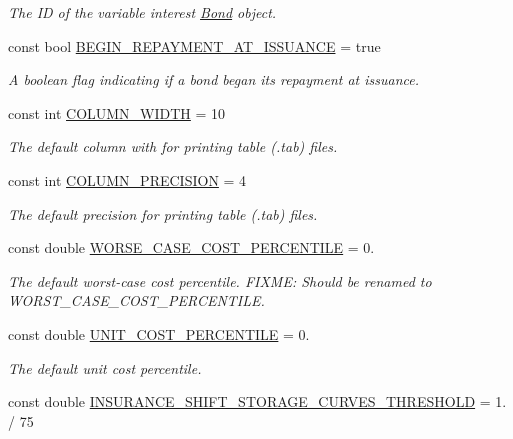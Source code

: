 \begin{DoxyCompactItemize}
\begin{DoxyCompactList}\small\item\em The ID of the variable interest \mbox{\hyperlink{classBond}{Bond}} object. \end{DoxyCompactList}\item 
const bool \mbox{\hyperlink{classConstants_a603925d07357a01d9531549e46b2936c}{B\+E\+G\+I\+N\+\_\+\+R\+E\+P\+A\+Y\+M\+E\+N\+T\+\_\+\+A\+T\+\_\+\+I\+S\+S\+U\+A\+N\+CE}} = true
\begin{DoxyCompactList}\small\item\em A boolean flag indicating if a bond began its repayment at issuance. \end{DoxyCompactList}\item 
const int \mbox{\hyperlink{classConstants_ab7a5abf9228bcce4babf9a84cd66deb1}{C\+O\+L\+U\+M\+N\+\_\+\+W\+I\+D\+TH}} = 10
\begin{DoxyCompactList}\small\item\em The default column with for printing table ({\ttfamily .tab}) files. \end{DoxyCompactList}\item 
const int \mbox{\hyperlink{classConstants_a52f7a9d94123775aa42a979c4c97dc71}{C\+O\+L\+U\+M\+N\+\_\+\+P\+R\+E\+C\+I\+S\+I\+ON}} = 4
\begin{DoxyCompactList}\small\item\em The default precision for printing table ({\ttfamily .tab}) files. \end{DoxyCompactList}\item 
const double \mbox{\hyperlink{classConstants_af0f5a11d2e7941b6c85ea1b8034d3996}{W\+O\+R\+S\+E\+\_\+\+C\+A\+S\+E\+\_\+\+C\+O\+S\+T\+\_\+\+P\+E\+R\+C\+E\+N\+T\+I\+LE}} = 0.
\begin{DoxyCompactList}\small\item\em The default worst-\/case cost percentile. F\+I\+X\+ME\+: Should be renamed to {\ttfamily W\+O\+R\+S\+T\+\_\+\+C\+A\+S\+E\+\_\+\+C\+O\+S\+T\+\_\+\+P\+E\+R\+C\+E\+N\+T\+I\+LE}. \end{DoxyCompactList}\item 
const double \mbox{\hyperlink{classConstants_a5d8074ae29c79331d667f61728233a5b}{U\+N\+I\+T\+\_\+\+C\+O\+S\+T\+\_\+\+P\+E\+R\+C\+E\+N\+T\+I\+LE}} = 0.
\begin{DoxyCompactList}\small\item\em The default unit cost percentile. \end{DoxyCompactList}\item 
const double \mbox{\hyperlink{classConstants_a40ab8dd088d886af9b5795c6b9db22ca}{I\+N\+S\+U\+R\+A\+N\+C\+E\+\_\+\+S\+H\+I\+F\+T\+\_\+\+S\+T\+O\+R\+A\+G\+E\+\_\+\+C\+U\+R\+V\+E\+S\+\_\+\+T\+H\+R\+E\+S\+H\+O\+LD}} = 1. / 75

\end{DoxyCompactItemize}
